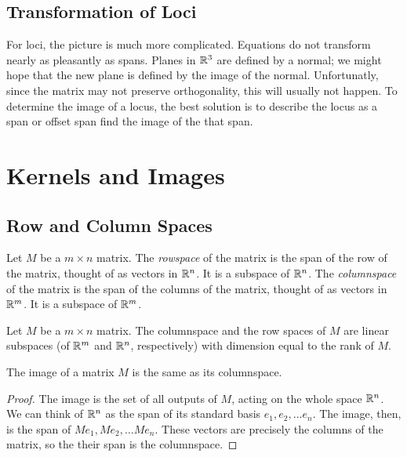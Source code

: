 \documentclass[fleqn]{report}
\begin{document}
\section{Transformation of Loci}

For loci, the picture is much more complicated. Equations do
not transform nearly as pleasantly as spans. Planes in $\mathbb{R}^3$
are defined by a normal; we might hope that the new plane is
defined by the image of the normal. Unfortunatly, since the
matrix may not preserve orthogonality, this will usually not
happen. To determine the image of a locus, the best solution
is to describe the locus as a span or offset span find the
image of the that span.

\chapter{Kernels and Images}
\label{kernels_and_images}

\section{Row and Column Spaces}

\begin{defn}
Let $M$ be a $m \times n$ matrix. The \emph{rowspace} of the
matrix is the span of the row of the matrix, thought of as
vectors in $\mathbb{R}^n$. It is a subspace of $\mathbb{R}^n$. The
\emph{columnspace} of the matrix is the span of the columns of
the matrix, thought of as vectors in $\mathbb{R}^m$. It is a
subspace of $\mathbb{R}^m$. 
\end{defn}

\begin{prop}
Let $M$ be a $m \times n$ matrix. The columnspace and the row
spaces of $M$ are linear subspaces (of $\mathbb{R}^m$ and $\mathbb{R}^n$,
respectively) with dimension equal to the rank of $M$.
\end{prop}

\begin{prop}
The image of a matrix $M$ is the same as its columnspace.
\end{prop}

\begin{proof}
The image is the set of all outputs of $M$, acting on the
whole space $\mathbb{R}^n$. We can think of $\mathbb{R}^n$ as the span of
its standard basis $e_1, e_2, \ldots e_n$. The image, then, is
the span of $Me_1, Me_2, \ldots Me_n$. These vectors are
precisely the columns of the matrix, so the their span is the
columnspace.
\end{proof}
\newpage
\end{document}
